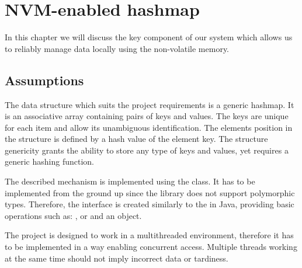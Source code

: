 
\chapter{NVM-enabled hashmap}
In this chapter we will discuss the key component of our system which allows us to reliably manage data locally using the non-volatile memory. 

\section{Assumptions}
    
    The data structure which suits the project requirements is a generic hashmap. 
    It is an associative array containing pairs of keys and values.
    The keys are unique for each item and allow its unambiguous identification. 
    The elements position in the structure is defined by a hash value of the element key. 
    The structure genericity grants the ability to store any type of keys and values, yet requires a generic hashing function.
    
    The described mechanism is implemented using the \NvmHashMap class. 
    It has to be implemented from the ground up since the \libpmemobj library does not support polymorphic types. 
    Therefore, the interface is created similarly to the \HashMap in Java, providing basic operations such as: \insertMethod, \getMethod or \removeMethod and an \Iterator object. 
    
    The project is designed to work in a multithreaded environment, therefore it has to be implemented in a way enabling concurrent access. 
    Multiple threads working at the same time should not imply incorrect data or tardiness. 
    
